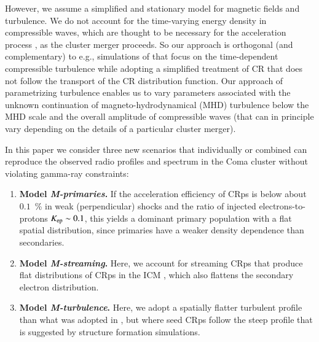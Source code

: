 \documentclass[fleqn,usenatbib,useAMS]{mnras}
\begin{document}
However, we assume a simplified and stationary model for magnetic
fields and turbulence. We do not account for the time-varying energy
density in compressible waves, which are thought to be necessary for
the acceleration process \citep{brunetti07,brunetti11}, as the cluster
merger proceeds.  So our approach is orthogonal (and complementary) to
e.g., simulations of \citealp{miniati15} that focus on the
time-dependent compressible turbulence while adopting a simplified
treatment of CR that does not follow the transport of the CR
distribution function. Our approach of parametrizing turbulence
enables us to vary parameters associated with the unknown continuation
of magneto-hydrodynamical (MHD) turbulence below the MHD scale and the
overall amplitude of compressible waves (that can in principle vary
depending on the details of a particular cluster merger).

In this paper we consider three new scenarios that
individually or combined can reproduce the observed radio profiles and
spectrum in the Coma cluster without violating gamma-ray constraints:
\begin{enumerate}
\item {\bf Model {\em M-primaries}.} If the acceleration efficiency of CRps is below
  about $0.1$~{\%} in weak (perpendicular) shocks and the ratio of injected
  electrons-to-protons $K_{{\mathrm{ep}}} \sim 0.1$, this yields a dominant primary
  population with a flat spatial distribution, since primaries have a weaker
  density dependence than secondaries.
\item {\bf Model {\em M-streaming}.} Here, we account for streaming CRps that
  produce flat distributions of CRps in the ICM
  \citep{ensslin11,wiener13,2014MNRAS.438..124Z}, which also flattens the
  secondary electron distribution.
\item {\bf Model {\em M-turbulence}.} Here, we adopt a spatially
  flatter turbulent profile than what was adopted in \citet{brunetti12},
  but where seed CRps follow the steep profile that is suggested by
  structure formation simulations.
\end{enumerate}
\end{document}
